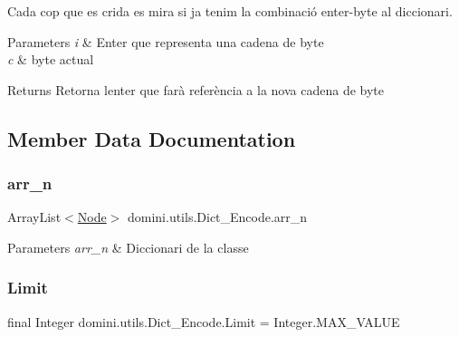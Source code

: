 Cada cop que es crida es mira si ja tenim la combinació enter-\/byte al diccionari. 


\begin{DoxyParams}{Parameters}
{\em i} & Enter que representa una cadena de byte \\
\hline
{\em c} & byte actual \\
\hline
\end{DoxyParams}
\begin{DoxyReturn}{Returns}
Retorna l\textquotesingle{}enter que farà referència a la nova cadena de byte 
\end{DoxyReturn}


\subsection{Member Data Documentation}
\mbox{\label{classdomini_1_1utils_1_1Dict__Encode_abc506ae01222e16d9b6581efbdad1a97}} 
\subsubsection{\texorpdfstring{arr\+\_\+n}{arr\_n}}
{\footnotesize\ttfamily Array\+List$<$\hyperlink{classdomini_1_1utils_1_1Node}{Node}$>$ domini.\+utils.\+Dict\+\_\+\+Encode.\+arr\+\_\+n\hspace{0.3cm}{\ttfamily [private]}}


\begin{DoxyParams}{Parameters}
{\em arr\+\_\+n} & Diccionari de la classe \\
\hline
\end{DoxyParams}
\mbox{\label{classdomini_1_1utils_1_1Dict__Encode_a48fe9a878056a119ad36a0aad2727a13}} 
\subsubsection{\texorpdfstring{Limit}{Limit}}
{\footnotesize\ttfamily final Integer domini.\+utils.\+Dict\+\_\+\+Encode.\+Limit = Integer.\+M\+A\+X\+\_\+\+V\+A\+L\+UE\hspace{0.3cm}{\ttfamily [static]}}


